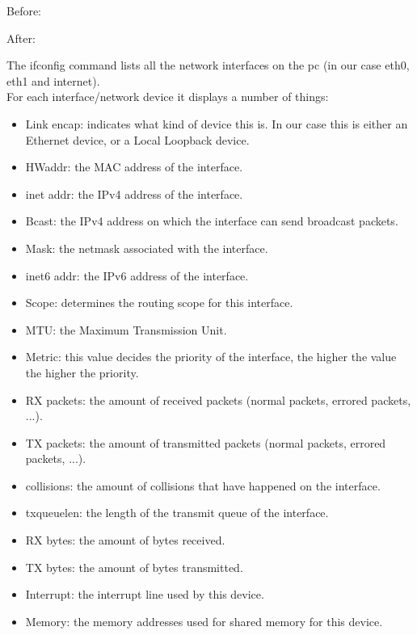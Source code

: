 Before: \newline

\newline
After: \newline


\newline
The ifconfig command lists all the network interfaces on the pc (in our case eth0, eth1 and internet). \\

For each interface/network device it displays a number of things:
\begin{itemize}
	\item Link encap: indicates what kind of device this is. In our case this is either an Ethernet device, or a Local Loopback device.
	\item HWaddr: the MAC address of the interface.
	\item inet addr: the IPv4 address of the interface.
	\item Bcast: the IPv4 address on which the interface can send broadcast packets.
	\item Mask: the netmask associated with the interface.
	\item inet6 addr: the IPv6 address of the interface.
	\item Scope: determines the routing scope for this interface. 
	\item MTU: the Maximum Transmission Unit.
	\item Metric: this value decides the priority of the interface, the higher the value the higher the priority.
	\item RX packets: the amount of received packets (normal packets, errored packets, ...).
	\item TX packets: the amount of transmitted packets (normal packets, errored packets, ...).
	\item collisions: the amount of collisions that have happened on the interface.
	\item txqueuelen: the length of the transmit queue of the interface.
	\item RX bytes: the amount of bytes received.
	\item TX bytes: the amount of bytes transmitted.
	\item Interrupt: the interrupt line used by this device.
	\item Memory: the memory addresses used for shared memory for this device.
\end{itemize}